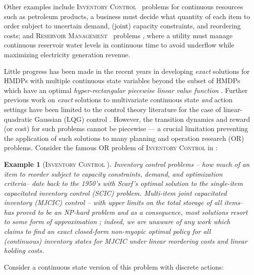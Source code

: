 \documentclass[twoside,11pt]{article}
\newcommand{\InventoryControl}{\textsc{Inventory Control }}
\newcommand{\WaterReservoir}{\textsc{Reservoir Management }}
\newtheorem*{example*}{Example}
\begin{document}
Other examples include \InventoryControl\ problems \cite{Scarf_Karlin58} for continuous resources such as petroleum products, a business must decide what quantity of each item to order subject to uncertain demand, (joint) capacity constraints, and reordering costs; and  \WaterReservoir\ problems \cite{reservoir}, where a utility must manage continuous reservoir water levels in continuous time to avoid underflow while maximizing electricity generation revenue.

Little progress has been made in the recent years in developing \emph{exact} solutions for HMDPs with multiple continuous state variables beyond the subset of HMDPs  which have an optimal \emph{hyper-rectangular piecewise linear value function} \cite{feng04,li05}. Further previous work on \emph{exact} solutions to multivariate continuous state \emph{and} action settings have been limited to the control theory literature for the case of linear-quadratic Gaussian (LQG) control \cite{lqgc}. 
However, the transition dynamics and reward (or cost) for such problems cannot be piecewise --- a crucial limitation preventing the application of such solutions to many planning and operation research (OR) problems. 
Consider the famous OR problem of \InventoryControl in \cite{Scarf_Karlin58}: 
\begin{example*} [\InventoryControl]
Inventory control problems -- how much of an
item to reorder subject to capacity constraints, demand, and optimization criteria-- date back to the 1950's with Scarf's optimal solution to the \emph{single-item capacitated inventory control} (SCIC) problem.
\emph{Multi-item joint capacitated inventory (MJCIC) control} -- with upper limits
on the total storage of all items-- has proved to be an NP-hard problem and
as a consequence, most solutions resort to some form of
approximation \cite{bitran,wusd10}; indeed, we are unaware of any 
work which claims to find an exact closed-form non-myopic
optimal policy for \emph{all} (continuous) inventory states for MJCIC 
under linear reordering costs and linear holding costs.
\end{example*}

Consider a continuous state version of this problem with discrete actions: 
\vspace{2mm}
\end{document}
